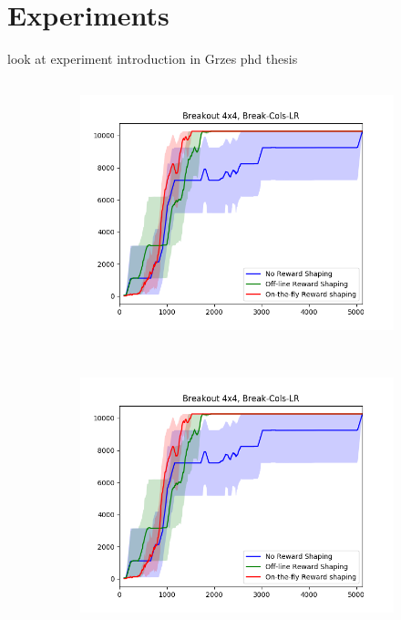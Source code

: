 \chapter{Experiments}\label{ch:experiments}
look at experiment introduction in Grzes phd thesis
\section{\Breakout}



\begin{figure}[h]
	 \centering
	 \begin{subfigure}[b]{0.3\textwidth}
	 	\includegraphics[width=\textwidth]{images/b44-cols-comparison.png}
	 \end{subfigure}
	 ~ %
	 \begin{subfigure}[b]{0.3\textwidth}
	 	\includegraphics[width=\textwidth]{images/b44-cols-comparison.png}

\end{subfigure}
\end{figure}
